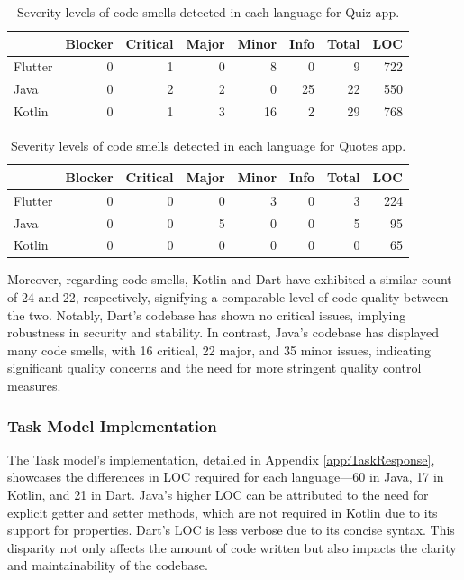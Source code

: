 \begin{table}[htbp]
    \begin{tabular}{l|r|r|r|r|r|r|r}
        \hline
        \cellcolor{Gray} & \cellcolor{Gray}Blocker & \cellcolor{Gray}Critical & \cellcolor{Gray}Major & \cellcolor{Gray}Minor & \cellcolor{Gray}Info & \cellcolor{Gray}Total & \cellcolor{Gray}LOC \\
        \hline
        \cellcolor{Gray}Flutter & 0 & 1 & 0 & 8 & 0 & 9 & 722 \\
        \cellcolor{Gray}Java    & 0 & 2 & 2 & 0 & 25 & 22 & 550 \\
        \cellcolor{Gray}Kotlin  & 0 & 1 & 3 & 16 & 2 & 29 & 768 \\
    \end{tabular}
    \caption{Severity levels of code smells detected in each language for Quiz app. \label{tab:quiz}}
\end{table}

\begin{table}[htbp]
    \begin{tabular}{l|r|r|r|r|r|r|r}
        \hline
        \cellcolor{Gray} & \cellcolor{Gray}Blocker & \cellcolor{Gray}Critical & \cellcolor{Gray}Major & \cellcolor{Gray}Minor & \cellcolor{Gray}Info & \cellcolor{Gray}Total & \cellcolor{Gray}LOC \\
        \hline
        \cellcolor{Gray}Flutter & 0 & 0 & 0 & 3 & 0 & 3 & 224 \\
        \cellcolor{Gray}Java    & 0 & 0 & 5 & 0 & 0 & 5 & 95 \\
        \cellcolor{Gray}Kotlin  & 0 & 0 & 0 & 0 & 0 & 0 & 65 \\
    \end{tabular}
    \caption{Severity levels of code smells detected in each language for Quotes app. \label{tab:quotes}}
\end{table}
\par
Moreover, regarding code smells, Kotlin and Dart have exhibited a similar count of 24 and 22, respectively, signifying a comparable level of code quality between the two. Notably, Dart's codebase has shown no critical issues, implying robustness in security and stability. In contrast, Java's codebase has displayed many code smells, with 16 critical, 22 major, and 35 minor issues, indicating significant quality concerns and the need for more stringent quality control measures.
\subsubsection{Task Model Implementation}
The Task model's implementation, detailed in Appendix \ref*{app:TaskResponse}, showcases the differences in LOC required for each language—60 in Java, 17 in Kotlin, and 21 in Dart. Java's higher LOC can be attributed to the need for explicit getter and setter methods, which are not required in Kotlin due to its support for properties. Dart's LOC is less verbose due to its concise syntax. This disparity not only affects the amount of code written but also impacts the clarity and maintainability of the codebase.

